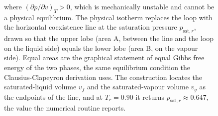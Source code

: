 \begin{figure}[htbp]
{where $(\partial p/\partial v)_T>0$, which is mechanically unstable and
cannot be a physical equilibrium. The physical isotherm replaces the loop
with the horizontal coexistence line at the saturation pressure
$p_{\text{sat},r}$, drawn so that the upper lobe (area A, between the line
and the loop on the liquid side) equals the lower lobe (area B, on the
vapour side). Equal areas are the graphical statement of equal Gibbs free
energy of the two phases, the same equilibrium condition the
Clausius-Clapeyron derivation uses. The construction locates the
saturated-liquid volume $v_f$ and the saturated-vapour volume $v_g$ as the
endpoints of the line, and at $T_r=0.90$ it returns $p_{\text{sat},r}\approx
0.647$, the value the numerical routine reports.}
\label{fig:vol04ch02:maxwell-equal-area}
\end{figure}
